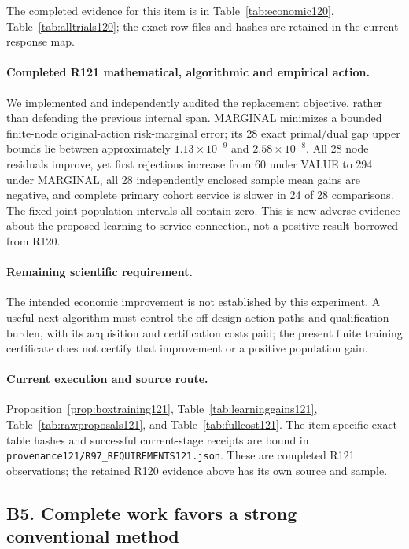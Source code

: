 The completed evidence for this item is in Table~\ref{tab:economic120}, Table~\ref{tab:alltrials120}; the exact row files and hashes are retained in the current response map.

\paragraph{Completed R121 mathematical, algorithmic and empirical action.}
We implemented and independently audited the replacement objective, rather than defending the previous internal span. MARGINAL minimizes a bounded finite-node original-action risk-marginal error; its 28 exact primal/dual gap upper bounds lie between approximately $1.13\times10^{-9}$ and $2.58\times10^{-8}$. All 28 node residuals improve, yet first rejections increase from 60 under VALUE to 294 under MARGINAL, all 28 independently enclosed sample mean gains are negative, and complete primary cohort service is slower in 24 of 28 comparisons. The fixed joint population intervals all contain zero. This is new adverse evidence about the proposed learning-to-service connection, not a positive result borrowed from R120.

\paragraph{Remaining scientific requirement.}
The intended economic improvement is not established by this experiment. A useful next algorithm must control the off-design action paths and qualification burden, with its acquisition and certification costs paid; the present finite training certificate does not certify that improvement or a positive population gain.

\paragraph{Current execution and source route.}
Proposition~\ref{prop:boxtraining121}, Table~\ref{tab:learninggains121}, Table~\ref{tab:rawproposals121}, and Table~\ref{tab:fullcost121}.
The item-specific exact table hashes and successful current-stage receipts are bound in \nolinkurl{provenance121/R97_REQUIREMENTS121.json}. These are completed R121 observations; the retained R120 evidence above has its own source and sample.

\subsection{B5. Complete work favors a strong conventional method}
\label{response121:B5}

